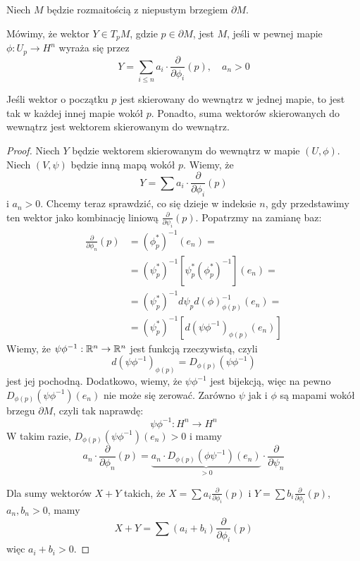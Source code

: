 Niech $M$ będzie rozmaitością z niepustym brzegiem $\partial M$. 

\begin{definition}
  Mówimy, że wektor $Y\in T_pM$, gdzie $p\in\partial M$, jest  $M$, jeśli w pewnej mapie $\phi:U_p\to H^n$ wyraża się przez
  $$Y=\sum_{i\leq n}a_i\cdot\frac{\partial}{\partial\phi_i}(p),\quad a_n>0$$
\end{definition}

\begin{fact}
  Jeśli wektor o początku $p$ jest skierowany do wewnątrz w jednej mapie, to jest tak w każdej innej mapie wokół $p$. Ponadto, suma wektorów skierowanych do wewnątrz jest wektorem skierowanym do wewnątrz.
\end{fact}

\begin{proof}
  Niech $Y$ będzie wektorem skierowanym do wewnątrz w mapie $(U,\phi)$. Niech $(V, \psi)$ będzie inną mapą wokół $p$. Wiemy, że
  $$Y=\sum a_i\cdot\frac{\partial}{\partial\phi_i}(p)$$
  i $a_n>0$. Chcemy teraz sprawdzić, co się dzieje w indeksie $n$, gdy przedstawimy ten wektor jako kombinację liniową $\frac{\partial}{\partial\psi_i}(p)$. Popatrzmy na zamianę baz:
  \begin{align*}
    \frac{\partial}{\partial\phi_n}(p)&=(\phi^*_p)^{-1}(e_n)=\\
        &=(\psi_p^*)^{-1}[\psi_p^*(\phi_p^*)^{-1}](e_n)=\\
        &=(\psi_p^*)^{-1}d\psi_p d(\phi)^{-1}_{\phi(p)}(e_n)=\\
        &=(\psi_p^*)^{-1}[d(\psi\phi^{-1})_{\phi(p)}(e_n)]
  \end{align*}
  Wiemy, że $\psi\phi^{-1}:\mathbb{R}^n\to\mathbb{R}^n$ jest funkcją rzeczywistą, czyli 
  $$d(\psi\phi^{-1})_{\phi(p)}=D_{\phi(p)}(\psi\phi^{-1})$$
  jest jej pochodną. Dodatkowo, wiemy, że $\psi\phi^{-1}$ jest bijekcją, więc na pewno $D_{\phi(p)}(\psi\phi^{-1})(e_n)$ nie może się zerować. Zarówno $\psi$ jak i $\phi$ są mapami wokół brzegu $\partial M$, czyli tak naprawdę:
  $$\psi\phi^{-1}:H^n\to H^n$$
  W takim razie, $D_{\phi(p)}(\psi\phi^{-1})(e_n)>0$ i mamy
  $$a_n\cdot\frac{\partial}{\partial\phi_n}(p)=\underbrace{a_n\cdot D_{\phi(p)}(\phi\psi^{-1})(e_n)}_{>0}\cdot\frac{\partial}{\partial\psi_n}$$
  


  Dla sumy wektorów $X+Y$ takich, że $X=\sum a_i\frac{\partial}{\partial\phi_i}(p)$ i $Y=\sum b_i\frac{\partial}{\partial\phi_i}(p)$, $a_n,b_n>0$, mamy
  $$X+Y=\sum(a_i+b_i)\frac{\partial}{\partial\phi_i}(p)$$
  więc $a_i+b_i>0$.
\end{proof}

